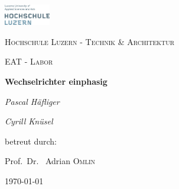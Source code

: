 
\begin{titlepage}
	\centering
	\includegraphics[width=0.15\textwidth]{pic/00_title/logo.png}
	\par\vspace{1cm}
	{\scshape\LARGE Hochschule Luzern - Technik \& Architektur \par}
	\vspace{1cm}
	{\scshape\Large EAT - Labor\par}
	\vspace{1.5cm}
	{\huge\bfseries Wechselrichter einphasig\par}
	\vspace{2cm}
	{\Large\itshape Pascal Häfliger\par}
	{\Large\itshape Cyrill Knüsel\par}
	\vfill
	betreut durch:\par
	Prof.~Dr.~ Adrian \textsc{Omlin}\par
	\vspace{1cm}
	

	\vfill  %

	{\large \today\par}
\end{titlepage}



\clearpage